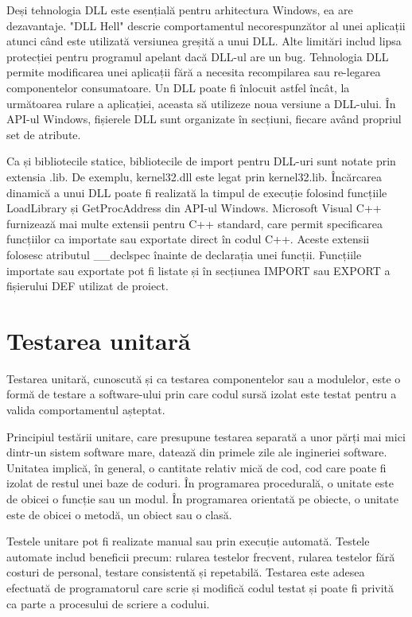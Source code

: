\documentclass[a4paper,12pt]{report}
\begin{document}
Deși tehnologia DLL este esențială pentru arhitectura Windows, ea are dezavantaje. "DLL Hell" descrie comportamentul necorespunzător al unei aplicații atunci când este utilizată versiunea greșită a unui DLL. Alte limitări includ lipsa protecției pentru programul apelant dacă DLL-ul are un bug. Tehnologia DLL permite modificarea unei aplicații fără a necesita recompilarea sau re-legarea componentelor consumatoare. Un DLL poate fi înlocuit astfel încât, la următoarea rulare a aplicației, aceasta să utilizeze noua versiune a DLL-ului. În API-ul Windows, fișierele DLL sunt organizate în secțiuni, fiecare având propriul set de atribute.

Ca și bibliotecile statice, bibliotecile de import pentru DLL-uri sunt notate prin extensia .lib. De exemplu, kernel32.dll este legat prin kernel32.lib. Încărcarea dinamică a unui DLL poate fi realizată la timpul de execuție folosind funcțiile LoadLibrary și GetProcAddress din API-ul Windows. Microsoft Visual C++ furnizează mai multe extensii pentru C++ standard, care permit specificarea funcțiilor ca importate sau exportate direct în codul C++. Aceste extensii folosesc atributul \_\_declspec înainte de declarația unei funcții. Funcțiile importate sau exportate pot fi listate și în secțiunea IMPORT sau EXPORT a fișierului DEF utilizat de proiect.

\section{Testarea unitară}
Testarea unitară, cunoscută și ca testarea componentelor sau a modulelor, este o formă de testare a software-ului prin care codul sursă izolat este testat pentru a valida comportamentul așteptat.

Principiul testării unitare, care presupune testarea separată a unor părți mai mici dintr-un sistem software mare, datează din primele zile ale ingineriei software. Unitatea implică, în general, o cantitate relativ mică de cod, cod care poate fi izolat de restul unei baze de coduri. În programarea procedurală, o unitate este de obicei o funcție sau un modul. În programarea orientată pe obiecte, o unitate este de obicei o metodă, un obiect sau o clasă.

Testele unitare pot fi realizate manual sau prin execuție automată. Testele automate includ beneficii precum: rularea testelor frecvent, rularea testelor fără costuri de personal, testare consistentă și repetabilă. Testarea este adesea efectuată de programatorul care scrie și modifică codul testat și poate fi privită ca parte a procesului de scriere a codului.
\end{document}
